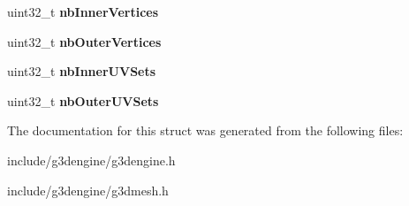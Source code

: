 \begin{DoxyCompactItemize}
uint32\+\_\+t {\bfseries nb\+Inner\+Vertices}
\item 
\mbox{\label{struct__G3DSUBDIVISION_a3d65dc1353d546a805c1b1cdb3c6a634}} 
uint32\+\_\+t {\bfseries nb\+Outer\+Vertices}
\item 
\mbox{\label{struct__G3DSUBDIVISION_a3672cd8ec435d7d50184d375e52055d5}} 
uint32\+\_\+t {\bfseries nb\+Inner\+U\+V\+Sets}
\item 
\mbox{\label{struct__G3DSUBDIVISION_a2494639046183f34315650a8ca16faf9}} 
uint32\+\_\+t {\bfseries nb\+Outer\+U\+V\+Sets}
\end{DoxyCompactItemize}


The documentation for this struct was generated from the following files\+:\begin{DoxyCompactItemize}
\item 
include/g3dengine/g3dengine.\+h\item 
include/g3dengine/g3dmesh.\+h\end{DoxyCompactItemize}
